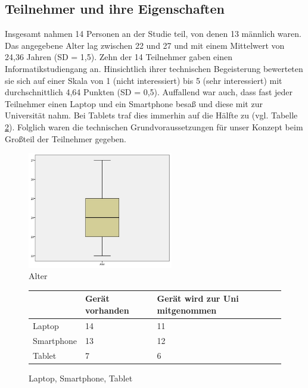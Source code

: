 \documentclass{chi-ext}
\begin{document}
\subsection{Teilnehmer und ihre Eigenschaften}

Insgesamt nahmen 14 Personen an der Studie teil, von denen 13 männlich waren. Das angegebene Alter lag zwischen 22 und 27 und mit einem Mittelwert von 24,36 Jahren (SD = 1,5). Zehn der 14 Teilnehmer gaben einen Informatikstudiengang an. Hinsichtlich ihrer technischen Begeisterung bewerteten sie sich auf einer Skala von 1 (nicht interessiert) bis 5 (sehr interessiert) mit durchschnittlich 4,64 Punkten (SD = 0,5).
Auffallend war auch, dass fast jeder Teilnehmer einen Laptop und ein Smartphone besaß und diese mit zur Universität nahm. Bei Tablets traf dies immerhin auf die Hälfte zu (vgl. Tabelle \ref{fig:studie_tabelle}). Folglich waren die technischen Grundvoraussetzungen für unser Konzept beim Großteil der Teilnehmer gegeben.

\begin{figure}
  \centering
  \includegraphics[width=180pt]{img/studie/Alter.jpg}
  \caption{Alter}
  \label{fig:studie_alter}
\end{figure}

\begin{figure}
  \centering
\begin{tabular}{|l|p{1.5cm}|p{3cm}|}
\hline 
 & Gerät vorhanden & Gerät wird zur \newline Uni mitgenommen \\ 
\hline 
Laptop & 14 & 11 \\ 
\hline 
Smartphone & 13 & 12 \\ 
\hline 
Tablet & 7 & 6 \\ 
\hline 
\end{tabular} 
  \caption{Laptop, Smartphone, Tablet}
  \label{fig:studie_tabelle}
\end{figure}
\end{document}
